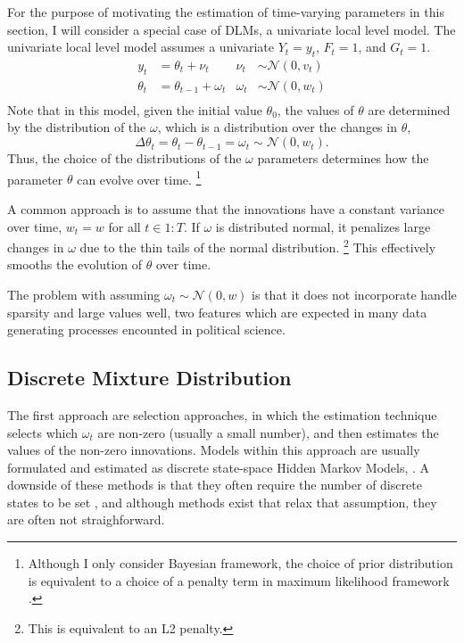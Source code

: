 \documentclass{article}
\newcommand{\paren}[1]{\ensuremath{\left(#1\right)}}
\newcommand{\dnorm}[1]{\ensuremath{\mathcal{N}\paren{#1}}}
\begin{document}
For the purpose of motivating the estimation of time-varying parameters in this section, I will consider a special case of DLMs, a univariate local level model.
The univariate local level model assumes a univariate $Y_{t} = y_{t}$, $F_{t} = 1$, and $G_{t} = 1$.
\begin{align}
  \label{eq:15}
  y_t &= \theta_t + \nu_t & \nu_{t} &\sim \dnorm{0, v_{t}} \\
  \label{eq:16}
  \theta_t &= \theta_{t-1} + \omega_{t} & \omega_{t} &\sim \dnorm{0, w_{t}} \\
\end{align}
Note that in this model, given the initial value $\theta_{0}$, the values of $\theta$ are determined by the distribution of the $\omega$, which is a distribution over the changes in $\theta$,
\begin{equation}
  \label{eq:12}
  \Delta \theta_{t} = \theta_{t} - \theta_{t - 1} = \omega_{t} \sim \dnorm{0, w_{t}} \text{.}
\end{equation}
Thus, the choice of the distributions of the $\omega$ parameters determines how the parameter $\theta$ can evolve over time.%
\footnote{Although I only consider Bayesian framework, the choice of prior distribution is equivalent to a choice of a penalty term in maximum likelihood framework \parencite{PolsonScott2010}.}

A common approach is to assume that the innovations have a constant variance over time, $w_{t} = w$  for all $t \in 1:T$.
If $\omega$ is distributed normal, it penalizes large changes in $\omega$ due to the thin tails of the normal distribution.%
\footnote{This is equivalent to an L2 penalty.}
This effectively smooths the evolution of $\theta$ over time.

The problem with assuming $\omega_{t} \sim \dnorm{0, w}$ is that it does not incorporate handle sparsity and large values well, two features which are expected in many data generating processes encounted in political science.

\subsection{Discrete Mixture Distribution}
\label{sec:discr-mixt-distr}

The first approach are selection approaches, in which the estimation technique selects which $\omega_{t}$ are non-zero (usually a small number), and then estimates the values of the non-zero innovations.
Models within this approach are usually formulated and estimated as discrete state-space Hidden Markov Models, \parencites{Chib1998}{spirling2007bayesian}{Park2011}{Park2010}{Blackwell2012}.
A downside of these methods is that they often require the number of discrete states to be set \parencite{Chib1998}, and although methods exist that relax that assumption, they are often not straighforward.
\end{document}
